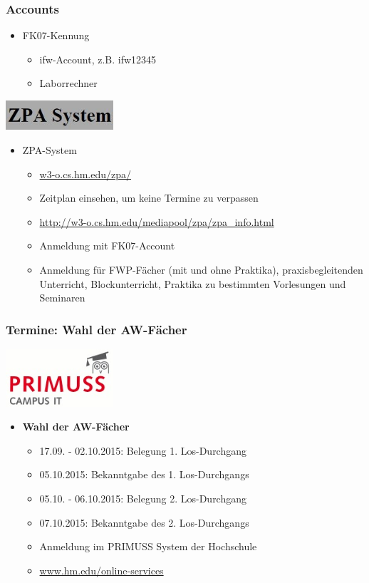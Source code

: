 \documentclass{beamer}
\begin{document}
    \begin{frame}[t]
    	\frametitle{Accounts}
    	\begin{itemize}
    		\item FK07-Kennung
    		\begin{itemize}
    			\item ifw-Account, z.B. ifw12345
    			\item Laborrechner
    		\end{itemize}
    	\end{itemize}
    	\pause
    	\flushright
    	\includegraphics[width=0.3\textwidth]{zpa.jpg}
    	\begin{itemize}
    		\item ZPA-System
    		\begin{itemize}
    			\item \url{w3-o.cs.hm.edu/zpa/}
    			\item Zeitplan einsehen, um keine Termine zu verpassen
    			\item \footnotesize{\url{http://w3-o.cs.hm.edu/mediapool/zpa/zpa_info.html}}
    			\item \normalsize{Anmeldung mit FK07-Account}$  $
    			\item Anmeldung für FWP-Fächer (mit und ohne Praktika),
    			praxisbegleitenden Unterricht,
    			Blockunterricht,
    			Praktika zu bestimmten Vorlesungen und
    			Seminaren
    		\end{itemize}
    	\end{itemize}
    \end{frame}
    
    \begin{frame}[t]
    	\frametitle{Termine: Wahl der AW-Fächer}
    	\flushright
    	\includegraphics[width=0.3\textwidth]{primuss.jpg}
    	\begin{itemize}
    		\item \textbf{Wahl der AW-Fächer}
    		    \begin{itemize}
    		    	\item 17.09. - 02.10.2015: Belegung 1. Los-Durchgang
    		    	\item 05.10.2015: Bekanntgabe des 1. Los-Durchgangs
    		    	\item 05.10. - 06.10.2015: Belegung 2. Los-Durchgang
    		    	\item 07.10.2015: Bekanntgabe des 2. Los-Durchgangs
    		    	\bigskip
    		    	\item Anmeldung im PRIMUSS System der Hochschule
    		    	\item \url{www.hm.edu/online-services}
    		    \end{itemize}
    	\end{itemize}
    \end{frame}
    
\end{document}

